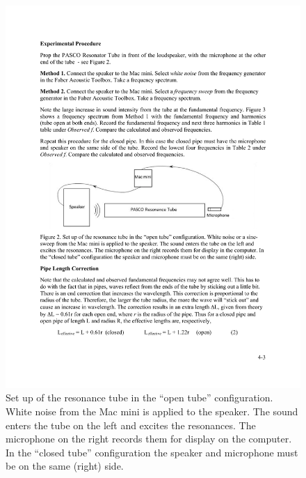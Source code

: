 \documentclass[11pt]{NSF}
\begin{document}
%
\begin{figure}[hbtp]
\begin{center}
\includegraphics[width=.65\textwidth]{fig4_2}
\caption{Set up of the resonance tube in the ``open tube” configuration. White
noise from the Mac mini is applied to the speaker. The sound
enters the tube on the left and excites the resonances. The microphone on the
right records them for display on the computer. In the ``closed tube” 
configuration the speaker and microphone must be on the same (right) side.}
\label{f:2} 
\end{center} 
\end{figure}
%
%
\end{document}
